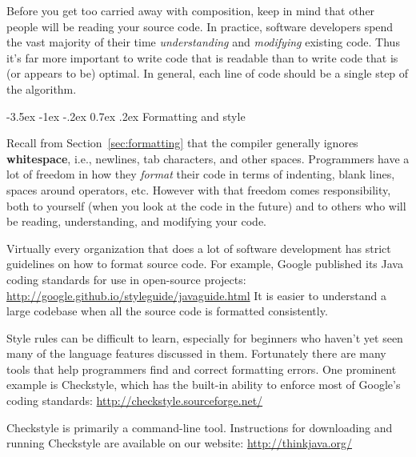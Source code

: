 \documentclass[12pt]{book}
\makeatletter
\theoremstyle{exercise}
\renewcommand{\section}{\@startsection {section}{1}{\z@}%
    {-3.5ex \@plus -1ex \@minus -.2ex}%
    {0.7ex \@plus.2ex}%
    {\normalfont\Large\bfseries}}
\makeatother
\begin{document}
Before you get too carried away with composition, keep in mind that other people will be reading your source code.
In practice, software developers spend the vast majority of their time {\em understanding} and {\em modifying} existing code.
Thus it's far more important to write code that is readable than to write code that is (or appears to be) optimal.
In general, each line of code should be a single step of the algorithm.


\section{Formatting and style}


Recall from Section~\ref{sec:formatting} that the compiler generally ignores {\bf whitespace}, i.e., newlines, tab characters, and other spaces.
Programmers have a lot of freedom in how they {\em format} their code in terms of indenting, blank lines, spaces around operators, etc.
However with that freedom comes responsibility, both to yourself (when you look at the code in the future) and to others who will be reading, understanding, and modifying your code.


Virtually every organization that does a lot of software development has strict guidelines on how to format source code.
For example, Google published its Java coding standards for use in open-source projects:
\url{http://google.github.io/styleguide/javaguide.html}
It is easier to understand a large codebase when all the source code is formatted consistently.


Style rules can be difficult to learn, especially for beginners who haven't yet seen many of the language features discussed in them.
Fortunately there are many tools that help programmers find and correct formatting errors.
One prominent example is Checkstyle, which has the built-in ability to enforce most of Google's coding standards:
\url{http://checkstyle.sourceforge.net/}

Checkstyle is primarily a command-line tool.
Instructions for downloading and running Checkstyle are available on our website: \url{http://thinkjava.org/}

\end{document}
